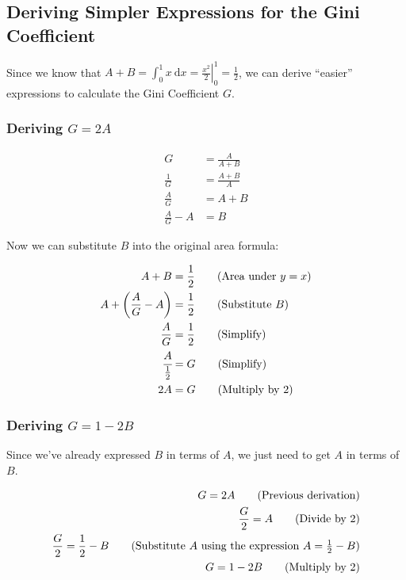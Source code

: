 \documentclass[
  letterpaper,
  DIV=11,
  numbers=noendperiod]{scrartcl}
\begin{document}
\hypertarget{deriving-simpler-expressions-for-the-gini-coefficient}{%
\subsection{Deriving Simpler Expressions for the Gini
Coefficient}\label{deriving-simpler-expressions-for-the-gini-coefficient}}

Since we know that
\(A+B = \int_{0}^{1} x \ \mathrm{d}x = \left.\frac{x^2}{2}\right\vert_{0}^{1} = \frac{1}{2}\),
we can derive ``easier'' expressions to calculate the Gini Coefficient
\(G\).

\hypertarget{deriving-g2a}{%
\subsubsection{\texorpdfstring{Deriving
\(G=2A\)}{Deriving G=2A}}\label{deriving-g2a}}

\begin{align}
G &= \frac{A}{A+B}\tag{Initial Gini Coefficient formula} \\
\frac{1}{G} &= \frac{A+B}{A}\tag{Reciprocate} \\
\frac{A}{G} &= A+B\tag{Multiply by $A$} \\
\frac{A}{G}-A &= B\tag{Subtract $A$}
\end{align}

\newpage{}

Now we can substitute \(B\) into the original area formula:

\begin{align}
A + B &= \frac{1}{2}\tag{Area under $y=x$} \\
A+\left(\frac{A}{G}-A\right) &= \frac{1}{2}\tag{Substitute $B$} \\
\frac{A}{G} &= \frac{1}{2}\tag{Simplify} \\
\cfrac{A}{\frac{1}{2}} &= G\tag{Simplify} \\
2A &= G\tag{Multiply by 2}
\end{align}

\hypertarget{deriving-g1-2b}{%
\subsubsection{\texorpdfstring{Deriving
\(G=1-2B\)}{Deriving G=1-2B}}\label{deriving-g1-2b}}

Since we've already expressed \(B\) in terms of \(A\), we just need to
get \(A\) in terms of \(B\).

\begin{align}
G = 2A \tag{Previous derivation} \\
\frac{G}{2} = A \tag{Divide by 2} \\
\frac{G}{2} = \frac{1}{2}-B\tag{Substitute $A$ using the expression $A=\frac{1}{2}-B$} \\
G = 1-2B\tag{Multiply by 2}
\end{align}
\end{document}
